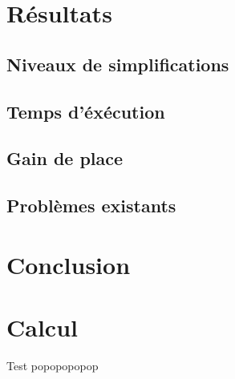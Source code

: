﻿\documentclass[12pt, twoside]{article}
\let\oldsection\section
\def\section{\cleardoublepage\oldsection}
\begin{document}
\section{Résultats}
\subsection{Niveaux de simplifications}
\subsection{Temps d'éxécution}
\subsection{Gain de place}
\subsection{Problèmes existants}

\newpage
\section*{Conclusion}

\newpage


\newpage
\appendix
\section{Calcul}
Test popopopopop
\end{document}
